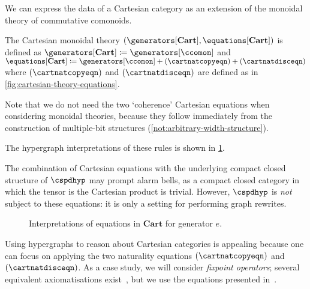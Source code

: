 We can express the data of a Cartesian category as an extension of the
monoidal theory of commutative comonoids.

\begin{definition}
    The Cartesian monoidal theory \(
    (\generators[\mathbf{Cart}], \equations[\mathbf{Cart}])
    \) is defined as \(
    \generators[\mathbf{Cart}] \coloneqq \generators[\ccomon]
    \) and \(
    \equations[\mathbf{Cart}]
    \coloneqq
    \generators[\ccomon] + (\cartnatcopyeqn) + (\cartnatdisceqn)
    \) where \((\cartnatcopyeqn)\) and \((\cartnatdisceqn)\) are defined as in
    \cref{fig:cartesian-theory-equations}.
\end{definition}

\begin{remark}
    Note that we do not need the two `coherence' Cartesian equations when
    considering monoidal theories, because they follow immediately from the
    construction of multiple-bit structures
    (\cref{not:arbitrary-width-structure}).
\end{remark}



The hypergraph interpretations of these rules is shown in
\cref{fig:cartesian-graphs}.

\begin{remark}
    The combination of Cartesian equations with the underlying compact closed
    structure of \(\cspdhyp\) may prompt alarm bells, as a compact closed
    category in which the tensor is the Cartesian product is trivial.
    However, \(\cspdhyp\) is \emph{not} subject to
    these equations: it is only a setting for performing graph
    rewrites.
\end{remark}

\begin{figure}
    \centering
    

    
    \caption{
        Interpretations of equations in \(\mathbf{Cart}\) for
        generator \(e\).
    }
    \label{fig:cartesian-graphs}
\end{figure}

Using hypergraphs to reason about Cartesian categories is appealing because one
can focus on applying the two naturality equations
\((\cartnatcopyeqn)\) and \((\cartnatdisceqn)\).
As a case study, we will consider \emph{fixpoint operators}; several equivalent
axiomatisations exist~\cite{hasegawa1997recursion,simpson2000complete}, but we
use the equations presented in~\cite{hasegawa2009traced}.

